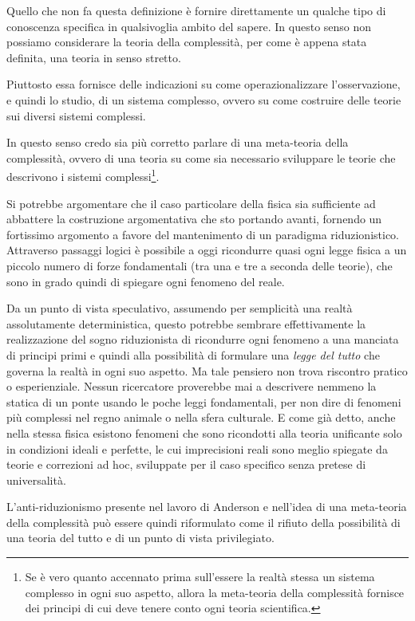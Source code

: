 \documentclass[a4paper, headings=standardclasses]{scrartcl}
\begin{document}
Quello che non fa questa definizione è fornire direttamente un qualche tipo di conoscenza specifica in qualsivoglia ambito del sapere.
In questo senso non possiamo considerare la teoria della complessità, per come è appena stata definita, una teoria in senso stretto.

Piuttosto essa fornisce delle indicazioni su come operazionalizzare l'osservazione, e quindi lo studio, di un sistema complesso, ovvero su come costruire delle teorie sui diversi sistemi complessi.

In questo senso credo sia più corretto parlare di una meta-teoria della complessità, ovvero di una teoria su come sia necessario sviluppare le teorie che descrivono i sistemi complessi\footnote{Se è vero quanto accennato prima sull'essere la realtà stessa un sistema complesso in ogni suo aspetto, allora la meta-teoria della complessità fornisce dei principi di cui deve tenere conto ogni teoria scientifica.}.

Si potrebbe argomentare che il caso particolare della fisica sia sufficiente ad abbattere la costruzione argomentativa che sto portando avanti, fornendo un fortissimo argomento a favore del mantenimento di un paradigma riduzionistico.
Attraverso passaggi logici è possibile a oggi ricondurre quasi ogni legge fisica a un piccolo numero di forze fondamentali (tra una e tre a seconda delle teorie), che sono in grado quindi di spiegare ogni fenomeno del reale.

Da un punto di vista speculativo, assumendo per semplicità una realtà assolutamente deterministica, questo potrebbe sembrare effettivamente la realizzazione del sogno riduzionista di ricondurre ogni fenomeno a una manciata di principi primi e quindi alla possibilità di formulare una \textit{legge del tutto} che governa la realtà in ogni suo aspetto. Ma tale pensiero non trova riscontro pratico o esperienziale.
Nessun ricercatore proverebbe mai a descrivere nemmeno la statica di un ponte usando le poche leggi fondamentali, per non dire di fenomeni più complessi nel regno animale o nella sfera culturale.
E come già detto, anche nella stessa fisica esistono fenomeni che sono ricondotti alla teoria unificante solo in condizioni ideali e perfette, le cui imprecisioni reali sono meglio spiegate da teorie e correzioni ad hoc, sviluppate per il caso specifico senza pretese di universalità.

L'anti-riduzionismo presente nel lavoro di Anderson e nell'idea di una meta-teoria della complessità può essere quindi riformulato come il rifiuto della possibilità di una teoria del tutto e di un punto di vista privilegiato.
\end{document}
